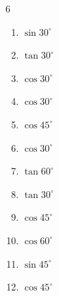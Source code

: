 \begin{multicols}{6}
\begin{enumerate}

  \item $\displaystyle \sin{30^\circ}$


  \item $\displaystyle \tan{30^\circ}$


  \item $\displaystyle \cos{30^\circ}$


  \item $\displaystyle \cos{30^\circ}$


  \item $\displaystyle \cos{45^\circ}$


  \item $\displaystyle \cos{30^\circ}$


  \item $\displaystyle \tan{60^\circ}$


  \item $\displaystyle \tan{30^\circ}$


  \item $\displaystyle \cos{45^\circ}$


  \item $\displaystyle \cos{60^\circ}$


  \item $\displaystyle \sin{45^\circ}$


  \item $\displaystyle \cos{45^\circ}$



\end{enumerate}
\end{multicols}
